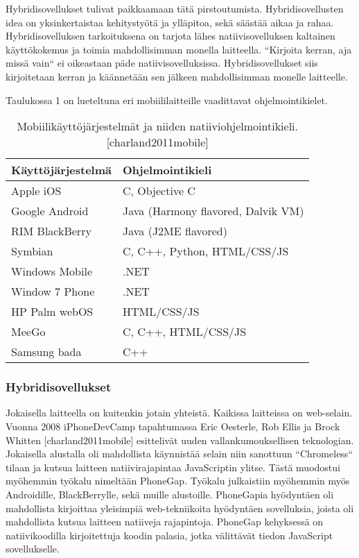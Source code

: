 \documentclass{tktltiki}
\begin{document}
Hybridisovellukset tulivat paikkaamaan tätä pirstoutumista. Hybridisovellusten idea on yksinkertaistaa kehitystyötä ja ylläpitoa, sekä säästää aikaa ja rahaa.  Hybridisovelluksen tarkoituksena on tarjota lähes natiivisovelluksen kaltainen käyttökokemus ja toimia mahdollisimman monella laitteella. “Kirjoita kerran, aja missä vain“ ei oikeastaan päde natiivisovelluksissa. Hybridisovellukset siis kirjoitetaan kerran ja käännetään sen jälkeen mahdollisimman monelle laitteelle. 


Taulukossa 1 on lueteltuna eri mobiililaitteille vaadittavat ohjelmointikielet.

\clearpage

\begin{table}[!ht]
\centering
\begin{small}
\caption{Mobiilikäyttöjärjestelmät ja niiden natiiviohjelmointikieli. [charland2011mobile] }
\begin{tabular}{|L{7cm}|L{7cm}|}
\hline
\textbf{Käyttöjärjestelmä} & 
\textbf{Ohjelmointikieli}
\\ \hline
Apple iOS & 
 C, Objective C
\\ \hline
Google Android & 
Java (Harmony flavored, Dalvik VM) \\ 
\hline
RIM BlackBerry & 
Java (J2ME flavored) \\ 
\hline
Symbian & 
C, C++, Python, HTML/CSS/JS \\ 
\hline
Windows Mobile & 
.NET \\ 
\hline
Window 7 Phone & 
.NET \\ 
\hline
HP Palm webOS & 
HTML/CSS/JS \\ 
\hline
MeeGo & 
C, C++, HTML/CSS/JS \\ 
\hline
Samsung bada & 
C++ \\ 
\hline
\end{tabular}
\label{table:ExampleTable2}
\end{small}
\end{table}


\subsubsection{Hybridisovellukset}

Jokaisella laitteella on kuitenkin jotain yhteistä. Kaikissa laitteissa on web-selain. Vuonna 2008 iPhoneDevCamp tapahtumassa Eric Oesterle, Rob Ellis ja Brock Whitten [charland2011mobile] esittelivät uuden vallankumouksellisen teknologian. Jokaisella alustalla oli mahdollista käynnistää selain niin sanottuun “Chromeless“ tilaan ja kutsua laitteen natiivirajapintaa JavaScriptin ylitse. Tästä muodostui myöhemmin työkalu nimeltään PhoneGap. Työkalu julkaistiin myöhemmin myös Androidille, BlackBerrylle, sekä muille alustoille. PhoneGapia hyödyntäen oli mahdollista kirjoittaa yleisimpiä web-tekniikoita hyödyntäen sovelluksia, joista oli mahdollista kutsua laitteen natiiveja rajapintoja. PhoneGap kehyksessä on natiivikoodilla kirjoitettuja koodin palasia, jotka välittävät tiedon JavaScript sovellukselle.
\end{document}
